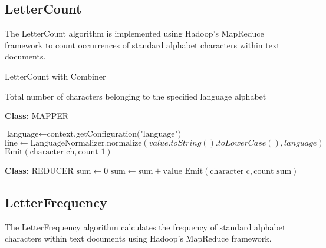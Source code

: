     

\subsection{LetterCount}
The LetterCount algorithm is implemented using Hadoop's MapReduce framework to count occurrences of standard alphabet characters within text documents.

\begin{algorithm}
    \caption{LetterCount with Combiner}
    \begin{algorithmic}[1]
    \Ensure Total number of characters belonging to the specified language alphabet
    \\
    \Statex
    
    \textbf{Class:} MAPPER

        \State $\text{language} \gets \text{context.getConfiguration("language")}$ 
    \EndProcedure\\
    
        \State $\text{line} \gets \text{LanguageNormalizer.normalize}(value.toString().toLowerCase(), language)$
                \State $\text{Emit}(\text{character ch}, \text{count 1})$
        \EndFor
    \EndProcedure\\
        
    \Statex
    
    \textbf{Class:} REDUCER
        \State $\text{sum} \gets 0$
            \State $\text{sum} \gets \text{sum} + \text{value}$
        \EndFor
        \State $\text{Emit}(\text{character c}, \text{count sum})$
    \EndProcedure
    \end{algorithmic}
    \end{algorithm}





\subsection{LetterFrequency}

The LetterFrequency algorithm calculates the frequency of standard alphabet characters within text documents using Hadoop's MapReduce framework.\\




